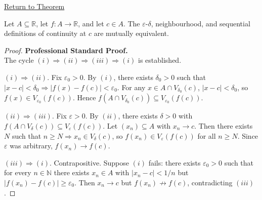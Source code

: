 \newpage
{}
\label{prf:continuity-three-equiv}

\begin{remark*}[Return]
\hyperref[thm:continuity-three-equiv]{Return to Theorem}
\end{remark*}

\begin{theorem*}
Let $A \subseteq \mathbb{R}$, let $f : A \to \mathbb{R}$, and let $c \in A$.
The $\varepsilon$-$\delta$, neighbourhood, and sequential definitions of
continuity at $c$ are mutually equivalent.
\end{theorem*}

\begin{proof}
\textbf{Professional Standard Proof.}~\\

The cycle $(i) \Rightarrow (ii) \Rightarrow (iii) \Rightarrow (i)$ is established.

\medskip
\noindent$(i) \Rightarrow (ii)$. Fix $\varepsilon_0 > 0$. By $(i)$, there
exists $\delta_0 > 0$ such that $|x - c| < \delta_0 \Rightarrow
|f(x) - f(c)| < \varepsilon_0$. For any $x \in A \cap V_{\delta_0}(c)$,
$|x - c| < \delta_0$, so $f(x) \in V_{\varepsilon_0}(f(c))$. Hence
$f(A \cap V_{\delta_0}(c)) \subseteq V_{\varepsilon_0}(f(c))$.

\medskip
\noindent$(ii) \Rightarrow (iii)$. Fix $\varepsilon > 0$. By $(ii)$, there
exists $\delta > 0$ with $f(A \cap V_\delta(c)) \subseteq
V_\varepsilon(f(c))$. Let $(x_n) \subseteq A$ with $x_n \to c$. Then
there exists $N$ such that $n \geq N \Rightarrow x_n \in V_\delta(c)$,
so $f(x_n) \in V_\varepsilon(f(c))$ for all $n \geq N$. Since
$\varepsilon$ was arbitrary, $f(x_n) \to f(c)$.

\medskip
\noindent$(iii) \Rightarrow (i)$. Contrapositive. Suppose $(i)$ fails:
there exists $\varepsilon_0 > 0$ such that for every $n \in \mathbb{N}$
there exists $x_n \in A$ with $|x_n - c| < 1/n$ but $|f(x_n) - f(c)|
\geq \varepsilon_0$. Then $x_n \to c$ but $f(x_n) \not\to f(c)$,
contradicting $(iii)$.
\end{proof}

